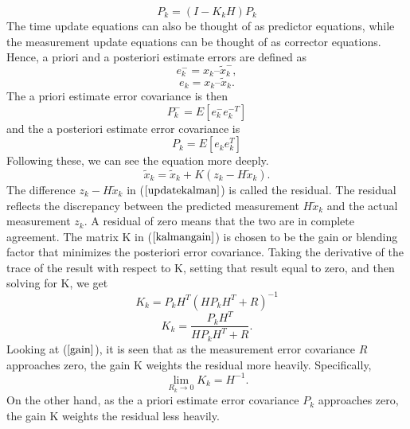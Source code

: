 \documentclass[journal]{IEEEtran}
\begin{document}
\begin{equation}
P_k = (I-K_kH)P_k
\end{equation}
The time update equations can also be thought of as predictor
equations, while the measurement update equations can be thought of
as corrector equations.
\newline
Hence, a priori and a posteriori estimate errors are defined as
\begin{equation}
e_k^- = x_k – \tilde x_k^- ,
\end{equation}
\begin{equation}
e_k =  x_k – \tilde x_k.
\end{equation}
The a priori estimate error covariance is then
\begin{equation}
P_k^- = E[ e_k^- e_k^{-T} ]
\end{equation}
and the a posteriori estimate error covariance is
\begin{equation}
P_k = E[e_k e_k^T]
\end{equation}
Following these, we can see the equation more deeply.
\begin{equation}
\tilde x_k = \tilde x_k + K(z_k-H\tilde x_k).
\label{updatekalman}
\end{equation}
The difference $z_k - H\tilde x_k$ in ($\ref{updatekalman}$) is called
the residual. The residual reflects the discrepancy between the
predicted measurement $H\tilde x_k$ and the actual measurement
$z_k$. A residual of zero means that the two are in complete
agreement. \newline
The matrix K in ($\ref{kalmangain}$) is
chosen to be the gain or blending factor that minimizes the
posteriori error covariance. Taking the derivative of the trace of
the result with respect to K, setting that result equal to zero, and
then solving for K, we get
\begin{equation}
K_k = P_kH^{T}(HP_kH^{T} + R)^{-1}
\end{equation}
\begin{equation}
K_k = \frac{P_kH^T}{HP_kH^T + R}. \label{gain}
\end{equation}
Looking at ($\ref{gain}$), it is seen that as the measurement error
covariance $R$ approaches zero, the gain K weights the residual more
heavily. Specifically,
\begin{equation}
\mathop {\lim }\limits_{R_k \to 0 } {K_k} = H^{-1}.
\end{equation}
On the other hand, as the a priori estimate error covariance $P_k$
approaches zero, the gain K weights the residual less heavily.
\end{document}
